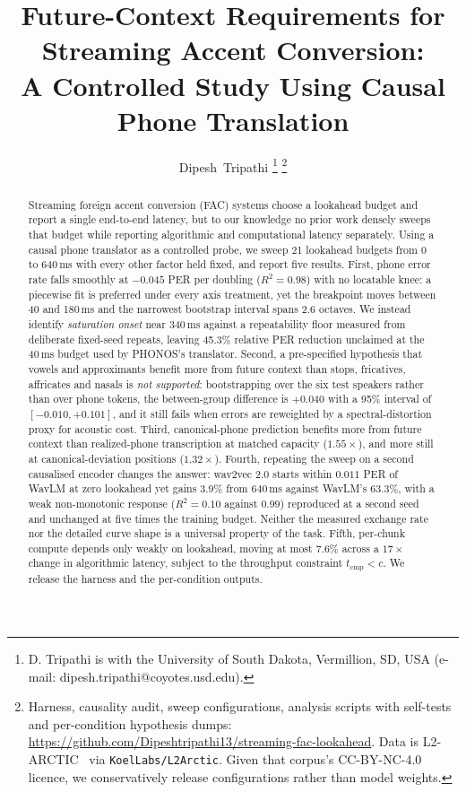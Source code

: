 \documentclass[journal]{IEEEtran}
\title{Future-Context Requirements for Streaming Accent Conversion:\\
A Controlled Study Using Causal Phone Translation}
\author{Dipesh~Tripathi%
\thanks{D. Tripathi is with the University of South Dakota, Vermillion, SD,
USA (e-mail: dipesh.tripathi@coyotes.usd.edu).}%
\thanks{Harness, causality audit, sweep configurations, analysis scripts with
self-tests and per-condition hypothesis dumps:
\url{https://github.com/Dipeshtripathi13/streaming-fac-lookahead}. Data is
L2-ARCTIC~\protect\cite{l2arctic2018} via \texttt{KoelLabs/L2Arctic}. Given
that corpus's CC-BY-NC-4.0 licence, we conservatively release configurations
rather than model weights.}}
\newcommand{\tcmp}{\ensuremath{t_{\mathrm{cmp}}}}
\begin{document}
\maketitle



\begin{abstract}
\noindent Streaming foreign accent conversion (FAC) systems choose a lookahead
budget and report a single end-to-end latency, but to our knowledge no prior
work densely sweeps that budget while reporting algorithmic and computational
latency separately. Using a causal phone translator as a controlled probe, we
sweep 21 lookahead budgets from 0 to 640\,ms with every other factor held
fixed, and report five results. First, phone error rate falls smoothly at
$-0.045$ PER per doubling ($R^2=0.98$) with no locatable knee: a piecewise fit
is preferred under every axis treatment, yet the breakpoint moves between 40
and 180\,ms and the narrowest bootstrap interval spans 2.6 octaves. We instead
identify \emph{saturation onset} near 340\,ms against a repeatability floor
measured from deliberate fixed-seed repeats, leaving 45.3\% relative PER
reduction unclaimed at the 40\,ms budget used by PHONOS's translator. Second, a
pre-specified hypothesis that vowels and approximants benefit more from future
context than stops, fricatives, affricates and nasals is \emph{not supported}:
bootstrapping over the six test speakers rather than over phone tokens, the
between-group difference is $+0.040$ with a 95\% interval of
$[-0.010, +0.101]$, and it still fails when errors are reweighted by a
spectral-distortion proxy for acoustic cost. Third, canonical-phone prediction
benefits more from future context than realized-phone transcription at matched
capacity ($1.55\times$), and more still at canonical-deviation positions
($1.32\times$). Fourth, repeating the sweep on a second causalised encoder
changes the answer: wav2vec 2.0 starts within $0.011$ PER of WavLM at zero
lookahead yet gains $3.9\%$ from $640$\,ms against WavLM's $63.3\%$, with a
weak non-monotonic response ($R^2=0.10$ against $0.99$) reproduced at a second
seed and unchanged at five times the training budget. Neither the measured
exchange rate nor the detailed curve shape is a universal property of the task.
Fifth, per-chunk compute depends only weakly on lookahead, moving at most
$7.6\%$ across a $17\times$ change in algorithmic latency, subject to the
throughput constraint $\tcmp<c$. We release the harness and the per-condition
outputs.
\end{abstract}
\end{document}
